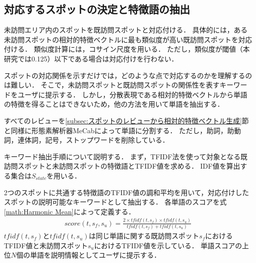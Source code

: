 \documentclass[submit]{ipsj}
\begin{document}
\subsection{対応するスポットの決定と特徴語の抽出}
\label{subsec:対応するスポットの決定と特徴語の抽出}
未訪問エリア内のスポットを既訪問スポットと対応付ける．
具体的には，ある未訪問スポットの相対的特徴ベクトルに最も類似度が高い既訪問スポットを対応付ける．
類似度計算には，コサイン尺度を用いる．
ただし，類似度が閾値（本研究では0.125）以下である場合は対応付けを行わない．

スポットの対応関係を示すだけでは，どのような点で対応するのかを理解するのは難しい．
そこで，未訪問スポットと既訪問スポットの関係性を表すキーワードをユーザに提示する．
しかし，分散表現である相対的特徴ベクトルから単語の特徴を得ることはできないため，他の方法を用いて単語を抽出する．

すべてのレビューを\ref{subsec:スポットのレビューから相対的特徴ベクトル生成}節と同様に形態素解析器MeCabによって単語に分割する．
ただし，助詞，助動詞，連体詞，記号，ストップワードを削除している．

キーワード抽出手順について説明する．
まず，TFIDF法を使って対象となる既訪問スポットと未訪問スポットの特徴語とTFIDF値を求める．
IDF値を算出する集合は$S_{state}$を用いる．

2つのスポットに共通する特徴語のTFIDF値の調和平均を用いて，対応付けしたスポットの説明可能なキーワードとして抽出する．
各単語のスコアを式\ref{math:Harmonic Mean}によって定義する．
\begin{eqnarray}
  score(t,s_f,s_u) = \frac{2 \times tfidf(t,s_f) \times tfidf(t,s_u)}{tfidf(t,s_f) + tfidf(t,s_u)}
  \label{math:Harmonic Mean}
\end{eqnarray}
$tfidf(t,s_f)$と$tfidf(t,s_u)$は同じ単語に関する既訪問スポット$s_f$におけるTFIDF値と未訪問スポット$s_u$におけるTFIDF値を示している．
単語スコアの上位$N$個の単語を説明情報としてユーザに提示する．
\end{document}
